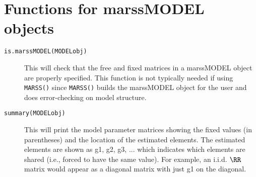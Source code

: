 
\section{Functions for marssMODEL objects}
\begin{description}	
		\item[\texttt{is.marssMODEL(MODELobj)}] This will check that the free and fixed matrices in a marssMODEL object are properly specified.  This function is not typically needed if using \texttt{MARSS()} since \texttt{MARSS()} builds the marssMODEL object for the user and does error-checking on model structure.
		\item[\texttt{summary(MODELobj)}] This will print the model parameter matrices showing the fixed values (in parentheses) and the location of the estimated elements.  The estimated elements are shown as g1, g2, g3, ... which indicates which elements are shared (i.e., forced to have the same value).  For example, an i.i.d. $\RR$ matrix would appear as a diagonal matrix with just g1 on the diagonal.
\end{description}
